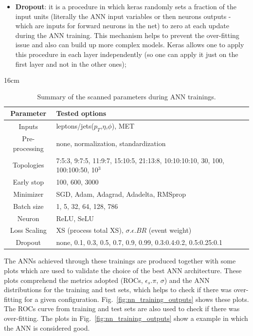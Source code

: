 \begin{itemize}
	\item \textbf{Dropout}: it is a procedure in which keras randomly sets a fraction of the input units (literally the ANN input variables or then neurons outputs - which are inputs for forward neurons in the net) to zero at each update during the ANN training. This mechanism helps to prevent the over-fitting issue and also can build up more complex models. Keras allows one to apply this procedure in each layer independently (so one can apply it just on the first layer and not in the other ones);
\end{itemize}

\begin{table}[hbtp]{16cm}
	\centering
	\caption{Summary of the scanned parameters during ANN trainings.}
	\begin{tabular}{c|l}
		\hline
		\rowcolor{light_gray}
		Parameter      & Tested options\\
		\hline
		Inputs         & leptons/jets($p_{T}$,$\eta$,$\phi$), MET\\
		\hline
		Pre-processing & none, normalization, standardization\\
		\hline
		Topologies     & 7:5:3, 9:7:5, 11:9:7, 15:10:5, 21:13:8, 10:10:10:10, 30, 100, 100:100:50, 10$^{3}$\\
		\hline
		Early stop     & 100, 600, 3000\\
		\hline
		Minimizer      & SGD, Adam, Adagrad, Adadelta, RMSprop\\
		\hline
		Batch size     & 1, 5, 32, 64, 128, 786\\
		\hline
		Neuron         & ReLU, SeLU\\
		\hline
		Loss Scaling   & XS (process total XS), $\sigma.\epsilon.BR$ (event weight)\\
		\hline
		Dropout        & none, 0.1, 0.3, 0.5, 0.7, 0.9, 0.99, 0.3:0.4:0.2, 0.5:0.25:0.1\\
		\hline
	\end{tabular}
	\label{tab:training_parameters_summary}	
\end{table}

The ANNs achieved through these trainings are produced together with some plots which are used to validate the choice of the best ANN architecture. These plots comprehend the metrics adopted (ROCs, $\epsilon_{s}.\pi$, $\sigma$) and the ANN distributions for the training and test sets, which helps to check if there was over-fitting for a given configuration. Fig.~\ref{fig:nn_training_outputs} shows these plots. The ROCs curve from training and test sets are also used to check if there was over-fitting. The plots in Fig.~\ref{fig:nn_training_outputs} show a example in which the ANN is considered good.

